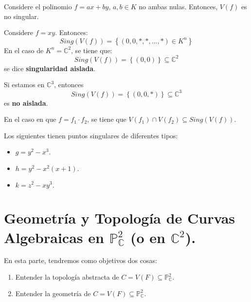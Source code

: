 \documentclass[12pt]{report}
\newcounter{it}
\theoremstyle{largebreak}
\begin{document}
    \begin{exa}
        Considere el polinomio $f=ax+by$, $a,b\in K$ no ambas nulas. Entonces, $V(f)$ es no singular.
    \end{exa}

    \begin{exa}
        Considere $f=xy$. Entonces:
        \begin{equation*}
            Sing(V(f))=\left\{(0,0,*,*,...,*)\in K^n \right\}
        \end{equation*}
        En el caso de $K^n=\mathbb{C}^2$, se tiene que:
        \begin{equation*}
            Sing(V(f))=\left\{(0,0) \right\}\subseteq\mathbb{C}^2
        \end{equation*}
        se dice \textbf{singularidad aislada}.

        Si estamos en $\mathbb{C}^3$, entonces
        \begin{equation*}
            Sing(V(f))=\left\{(0,0,*) \right\}\subseteq\mathbb{C}^3
        \end{equation*}
        es \textbf{no aislada}.
    \end{exa}

    \begin{exa}
        En el caso en que $f=f_1\cdot f_2$, se tiene que $V(f_1)\cap V(f_2)\subseteq Sing(V(f))$.
    \end{exa}

    \begin{exa}
        Los siguientes tienen puntos singulares de diferentes tipos:
        \begin{itemize}
            \item $g=y^2-x^3$.
            \item $h=y^2-x^2(x+1)$.
            \item $k=z^2-xy^3$.
        \end{itemize}
    \end{exa}

    \section{Geometría y Topología de Curvas Algebraicas en $\mathbb{P}^2_{\mathbb{C}}$ (o en $\mathbb{C}^2$).}

    En esta parte, tendremos como objetivos dos cosas:

    \begin{enumerate}[label = \textit{(\arabic*)}]
        \item Entender la topología abstracta de $C=V(F)\subseteq\mathbb{P}^2_{\mathbb{C}}$.
        \item Entender la geometría de $C=V(F)\subseteq\mathbb{P}^2_{\mathbb{C}}$.
    \end{enumerate}
\end{document}
